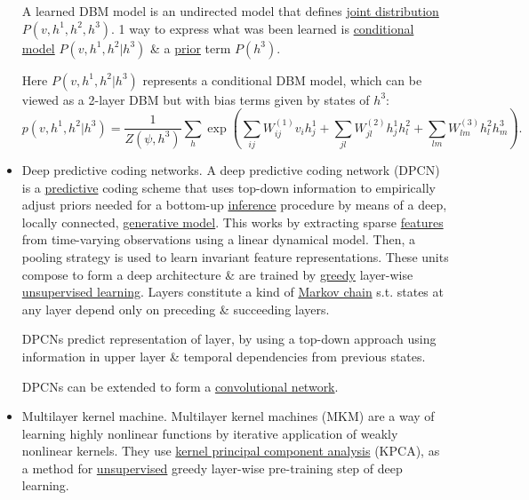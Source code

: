 \documentclass{article}
\begin{document}
\begin{itemize}
	A learned DBM model is an undirected model that defines \href{https://en.wikipedia.org/wiki/Joint_distribution}{joint distribution} $P(v,h^1,h^2,h^3)$. 1 way to express what was been learned is \href{https://en.wikipedia.org/wiki/Discriminative_model}{conditional model} $P(v,h^1,h^2|h^3)$ \& a \href{https://en.wikipedia.org/wiki/Prior_distribution}{prior} term $P(h^3)$.
	
	Here $P(v,h^1,h^2|h^3)$ represents a conditional DBM model, which can be viewed as a 2-layer DBM but with bias terms given by states of $h^3$:
	\begin{equation}
		p(v,h^1,h^2|h^3) = \frac{1}{Z(\psi,h^3)}\sum_h \exp\left(\sum_{ij} W_{ij}^{(1)}v_ih_j^1 + \sum_{jl} W_{jl}^{(2)}h_j^1h_l^2 + \sum_{lm} W_{lm}^{(3)}h_l^2h_m^3\right).
	\end{equation}
	\item {\sf Deep predictive coding networks.} A deep predictive coding network (DPCN) is a \href{https://en.wikipedia.org/wiki/Predictive_modelling}{predictive} coding scheme that uses top-down information to empirically adjust priors needed for a bottom-up \href{https://en.wikipedia.org/wiki/Inference}{inference} procedure by means of a deep, locally connected, \href{https://en.wikipedia.org/wiki/Generative_model}{generative model}. This works by extracting sparse \href{https://en.wikipedia.org/wiki/Feature_(machine_learning)}{features} from time-varying observations using a linear dynamical model. Then, a pooling strategy is used to learn invariant feature representations. These units compose to form a deep architecture \& are trained by \href{https://en.wikipedia.org/wiki/Greedy_algorithm}{greedy} layer-wise \href{https://en.wikipedia.org/wiki/Unsupervised_learning}{unsupervised learning}. Layers constitute a kind of \href{https://en.wikipedia.org/wiki/Markov_chain}{Markov chain} s.t. states at any layer depend only on preceding \& succeeding layers.
	
	DPCNs predict representation of layer, by using a top-down approach using information in upper layer \& temporal dependencies from previous states.
	
	DPCNs can be extended to form a \href{https://en.wikipedia.org/wiki/Convolutional_neural_network}{convolutional network}.
	\item {\sf Multilayer kernel machine.} Multilayer kernel machines (MKM) are a way of learning highly nonlinear functions by iterative application of weakly nonlinear kernels. They use \href{https://en.wikipedia.org/wiki/Kernel_principal_component_analysis}{kernel principal component analysis} (KPCA), as a method for \href{https://en.wikipedia.org/wiki/Unsupervised_learning}{unsupervised} greedy layer-wise pre-training step of deep learning.
	

\end{itemize}
\end{document}
